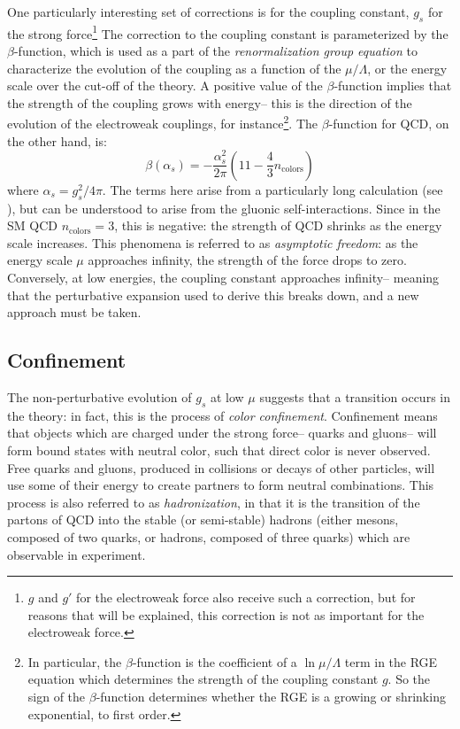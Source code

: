 One particularly interesting set of corrections is for the coupling constant, $g_s$ for the strong force\footnote{$g$ and $g'$ for the electroweak force also receive such a correction, but for reasons that will be explained, this correction is not as important for the electroweak force.} The correction to the coupling constant is parameterized by the $\beta$-function, which is used as a part of the \textit{renormalization group equation} to characterize the evolution of the coupling as a function of the $\mu/\Lambda$, or the energy scale over the cut-off of the theory. A positive value of the $\beta$-function implies that the strength of the coupling grows with energy-- this is the direction of the evolution of the electroweak couplings, for instance\footnote{In particular, the $\beta$-function is the coefficient of a $\ln{\mu/\Lambda}$ term in the RGE equation which determines the strength of the coupling constant $g$. So the sign of the $\beta$-function determines whether the RGE is a growing or shrinking exponential, to first order.}. The $\beta$-function for QCD, on the other hand, is:
%
\begin{equation}
\beta(\alpha_s) = - \frac{\alpha_s^2}{2\pi} \left(11 - \frac{4}{3}n_\mathrm{colors}\right)
\end{equation} 
%
where $\alpha_s = g_s^2 / 4\pi$. The terms here arise from a particularly long calculation (see \cite{schwartz}), but can be understood to arise from the gluonic self-interactions. Since in the SM QCD $n_\mathrm{colors} = 3$, this is negative: the strength of QCD shrinks as the energy scale increases. This phenomena is referred to as \textit{asymptotic freedom}: as the energy scale $\mu$ approaches infinity, the strength of the force drops to zero. Conversely, at low energies, the coupling constant approaches infinity-- meaning that the perturbative expansion used to derive this breaks down, and a new approach must be taken. 

\subsection{Confinement}

The non-perturbative evolution of $g_s$ at low $\mu$ suggests that a transition occurs in the theory: in fact, this is the process of \textit{color confinement}. Confinement means that objects which are charged under the strong force-- quarks and gluons-- will form bound states with neutral color, such that direct color is never observed. Free quarks and gluons, produced in collisions or decays of other particles, will use some of their energy to create partners to form neutral combinations. This process is also referred to as \textit{hadronization}, in that it is the transition of the partons of QCD into the stable (or semi-stable) hadrons (either mesons, composed of two quarks, or hadrons, composed of three quarks) which are observable in experiment. 

